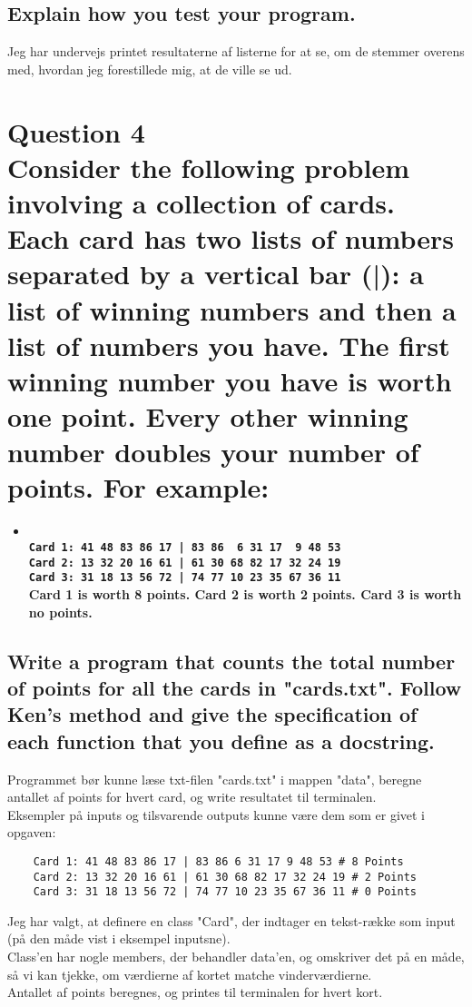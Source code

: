 \documentclass[a4paper,12pt]{article}
\begin{document}
\subsection{Explain how you test your program.}

Jeg har undervejs printet resultaterne af listerne for at se, om de stemmer overens med, hvordan jeg forestillede mig, at de ville se ud.

\section{Question 4\\
Consider the following problem involving a collection of cards.
Each card has two lists of numbers separated by a vertical bar (|): a list of winning numbers and then a list of numbers you have.
The first winning number you have is worth one point. Every other winning number doubles your number of points.
For example:}
\begin{itemize}
    \item[] \textbf{\\
    \lstinline{Card 1: 41 48 83 86 17 | 83 86  6 31 17  9 48 53}\\
    \lstinline{Card 2: 13 32 20 16 61 | 61 30 68 82 17 32 24 19}\\
    \lstinline{Card 3: 31 18 13 56 72 | 74 77 10 23 35 67 36 11}\\
    Card 1 is worth 8 points. Card 2 is worth 2 points. Card 3 is worth no points.}
\end{itemize}

\subsection{Write a program that counts the total number of points for all the cards in "cards.txt".
Follow Ken's method and give the specification of each function that you define as a docstring.}

Programmet bør kunne læse txt-filen "cards.txt" i mappen "data", beregne antallet af points for hvert card, og write resultatet til terminalen.\\
Eksempler på inputs og tilsvarende outputs kunne være dem som er givet i opgaven:
\begin{lstlisting}
    Card 1: 41 48 83 86 17 | 83 86 6 31 17 9 48 53 # 8 Points
    Card 2: 13 32 20 16 61 | 61 30 68 82 17 32 24 19 # 2 Points
    Card 3: 31 18 13 56 72 | 74 77 10 23 35 67 36 11 # 0 Points
\end{lstlisting} 
Jeg har valgt, at definere en class "Card", der indtager en tekst-række som input (på den måde vist i eksempel inputsne).\\
Class'en har nogle members, der behandler data'en, og omskriver det på en måde, så vi kan tjekke, om værdierne af kortet matche vinderværdierne.\\
Antallet af points beregnes, og printes til terminalen for hvert kort.
\end{document}
